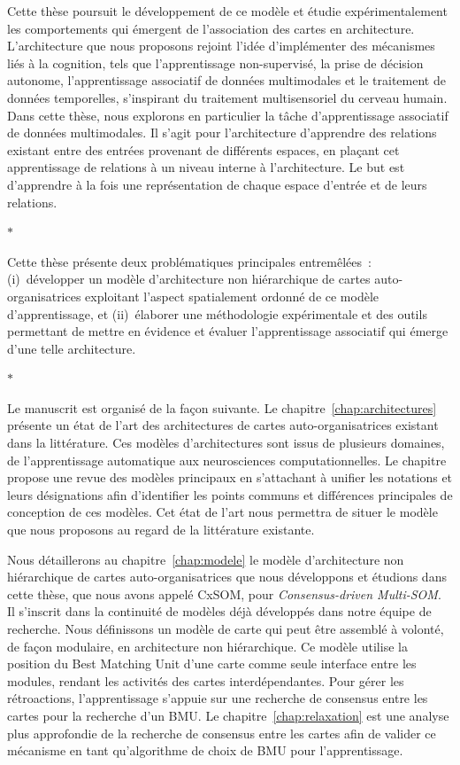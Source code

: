 Cette thèse poursuit le développement de ce modèle et étudie expérimentalement les comportements qui émergent de l'association des cartes en architecture.
L'architecture que nous proposons rejoint l'idée d'implémenter des mécanismes liés à la cognition, tels que l'apprentissage non-supervisé, la prise de décision autonome, l'apprentissage associatif de données multimodales et le traitement de données temporelles, s'inspirant du traitement multisensoriel du cerveau humain. 
Dans cette thèse, nous explorons en particulier la tâche d'apprentissage associatif de données multimodales.
Il s'agit pour l'architecture d'apprendre des relations existant entre des entrées provenant de différents espaces, en plaçant cet apprentissage de relations à un niveau interne à l'architecture. Le but est d'apprendre à la fois une représentation de chaque espace d'entrée et de leurs relations.

\begin{center}
  $\ast$
\end{center}

Cette thèse présente deux problématiques principales entremêlées~: (i)~développer un modèle d'architecture non hiérarchique de cartes auto-organisatrices exploitant l'aspect spatialement ordonné de ce modèle d'apprentissage, et (ii)~élaborer une méthodologie expérimentale et des outils permettant de mettre en évidence et évaluer l'apprentissage associatif qui émerge d'une telle architecture.

\begin{center}
  $\ast$
\end{center}

Le manuscrit est organisé de la façon suivante.
Le chapitre~\ref{chap:architectures} présente un état de l'art des architectures de cartes auto-organisatrices existant dans la littérature. Ces modèles d'architectures sont issus de plusieurs domaines, de l'apprentissage automatique aux neurosciences computationnelles.
Le chapitre propose une revue des modèles principaux en s'attachant à unifier les notations et leurs désignations afin d'identifier les points communs et différences principales de conception de ces modèles.
Cet état de l'art nous permettra de situer le modèle que nous proposons au regard de la littérature existante.

Nous détaillerons au chapitre~\ref{chap:modele} le modèle d'architecture non hiérarchique de cartes auto-organisatrices que nous développons et étudions dans cette thèse, que nous avons appelé CxSOM, pour \emph{Consensus-driven Multi-SOM}. Il s'inscrit dans la continuité de modèles déjà développés dans notre équipe de recherche.
Nous définissons un modèle de carte qui peut être assemblé à volonté, de façon modulaire, en architecture non hiérarchique. Ce modèle utilise la position du Best Matching Unit d'une carte comme seule interface entre les modules, rendant les activités des cartes interdépendantes. Pour gérer les rétroactions, l'apprentissage s'appuie sur une recherche de consensus entre les cartes pour la recherche d'un BMU.
Le chapitre~\ref{chap:relaxation} est une analyse plus approfondie de la recherche de consensus entre les cartes afin de valider ce mécanisme en tant qu'algorithme de choix de BMU pour l'apprentissage.

